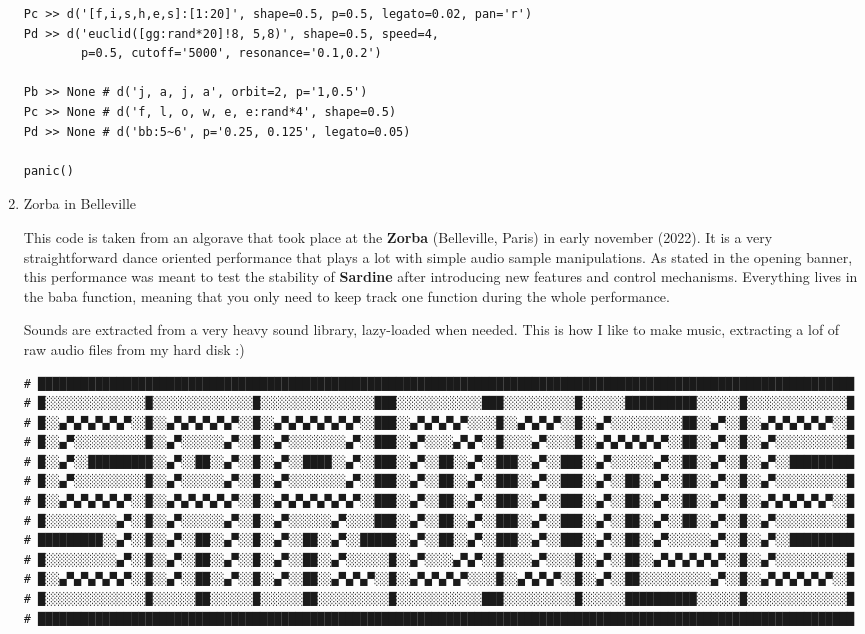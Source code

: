 \documentclass[11pt]{article}
\begin{document}
\begin{enumerate}
\begin{verbatim}
Pc >> d('[f,i,s,h,e,s]:[1:20]', shape=0.5, p=0.5, legato=0.02, pan='r')
Pd >> d('euclid([gg:rand*20]!8, 5,8)', shape=0.5, speed=4,
        p=0.5, cutoff='5000', resonance='0.1,0.2')

Pb >> None # d('j, a, j, a', orbit=2, p='1,0.5')
Pc >> None # d('f, l, o, w, e, e:rand*4', shape=0.5)
Pd >> None # d('bb:5~6', p='0.25, 0.125', legato=0.05)

panic()
\end{verbatim}

\item Zorba in Belleville
\label{sec:org9978337}

This code is taken from an algorave that took place at the \textbf{Zorba} (Belleville, Paris) in early november (2022). It is a very straightforward dance oriented performance that plays a lot with simple audio sample manipulations. As stated in the opening banner, this performance was meant to test the stability of \textbf{Sardine} after introducing new features and control mechanisms. Everything lives in the baba function, meaning that you only need to keep track one function during the whole performance.

Sounds are extracted from a very heavy sound library, lazy-loaded when needed. This is how I like to make music, extracting a lof of raw audio files from my hard disk :)

\begin{verbatim}
# ██████████████████████████████████████████████████████████████████████████████████████████████████████████████████
# █░░░░░░░░░░░░░░█░░░░░░░░░░░░░░█░░░░░░░░░░░░░░░░███░░░░░░░░░░░░███░░░░░░░░░░█░░░░░░██████████░░░░░░█░░░░░░░░░░░░░░█
# █░░▄▀▄▀▄▀▄▀▄▀░░█░░▄▀▄▀▄▀▄▀▄▀░░█░░▄▀▄▀▄▀▄▀▄▀▄▀░░███░░▄▀▄▀▄▀▄▀░░░░█░░▄▀▄▀▄▀░░█░░▄▀░░░░░░░░░░██░░▄▀░░█░░▄▀▄▀▄▀▄▀▄▀░░█
# █░░▄▀░░░░░░░░░░█░░▄▀░░░░░░▄▀░░█░░▄▀░░░░░░░░▄▀░░███░░▄▀░░░░▄▀▄▀░░█░░░░▄▀░░░░█░░▄▀▄▀▄▀▄▀▄▀░░██░░▄▀░░█░░▄▀░░░░░░░░░░█
# █░░▄▀░░█████████░░▄▀░░██░░▄▀░░█░░▄▀░░████░░▄▀░░███░░▄▀░░██░░▄▀░░███░░▄▀░░███░░▄▀░░░░░░▄▀░░██░░▄▀░░█░░▄▀░░█████████
# █░░▄▀░░░░░░░░░░█░░▄▀░░░░░░▄▀░░█░░▄▀░░░░░░░░▄▀░░███░░▄▀░░██░░▄▀░░███░░▄▀░░███░░▄▀░░██░░▄▀░░██░░▄▀░░█░░▄▀░░░░░░░░░░█
# █░░▄▀▄▀▄▀▄▀▄▀░░█░░▄▀▄▀▄▀▄▀▄▀░░█░░▄▀▄▀▄▀▄▀▄▀▄▀░░███░░▄▀░░██░░▄▀░░███░░▄▀░░███░░▄▀░░██░░▄▀░░██░░▄▀░░█░░▄▀▄▀▄▀▄▀▄▀░░█
# █░░░░░░░░░░▄▀░░█░░▄▀░░░░░░▄▀░░█░░▄▀░░░░░░▄▀░░░░███░░▄▀░░██░░▄▀░░███░░▄▀░░███░░▄▀░░██░░▄▀░░██░░▄▀░░█░░▄▀░░░░░░░░░░█
# █████████░░▄▀░░█░░▄▀░░██░░▄▀░░█░░▄▀░░██░░▄▀░░█████░░▄▀░░██░░▄▀░░███░░▄▀░░███░░▄▀░░██░░▄▀░░░░░░▄▀░░█░░▄▀░░█████████
# █░░░░░░░░░░▄▀░░█░░▄▀░░██░░▄▀░░█░░▄▀░░██░░▄▀░░░░░░█░░▄▀░░░░▄▀▄▀░░█░░░░▄▀░░░░█░░▄▀░░██░░▄▀▄▀▄▀▄▀▄▀░░█░░▄▀░░░░░░░░░░█
# █░░▄▀▄▀▄▀▄▀▄▀░░█░░▄▀░░██░░▄▀░░█░░▄▀░░██░░▄▀▄▀▄▀░░█░░▄▀▄▀▄▀▄▀░░░░█░░▄▀▄▀▄▀░░█░░▄▀░░██░░░░░░░░░░▄▀░░█░░▄▀▄▀▄▀▄▀▄▀░░█
# █░░░░░░░░░░░░░░█░░░░░░██░░░░░░█░░░░░░██░░░░░░░░░░█░░░░░░░░░░░░███░░░░░░░░░░█░░░░░░██████████░░░░░░█░░░░░░░░░░░░░░█
# ██████████████████████████████████████████████████████████████████████████████████████████████████████████████████


\end{verbatim}
\end{enumerate}
\end{document}
